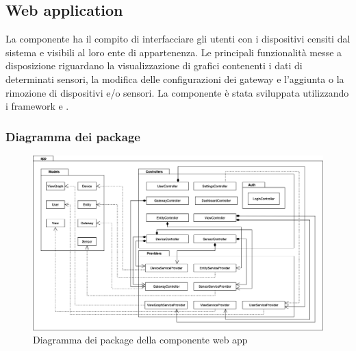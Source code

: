 \subsection{Web application}
	La componente  ha il compito di interfacciare gli utenti con i dispositivi censiti dal sistema e visibili al loro ente di appartenenza.
	\newline
	Le principali funzionalità messe a disposizione riguardano la visualizzazione di grafici contenenti i dati di determinati sensori, la modifica delle configurazioni dei gateway e l'aggiunta o la rimozione di dispositivi e/o sensori.
	\newline 
	La componente è stata sviluppata utilizzando i framework  e .
	
	\subsubsection{Diagramma dei package}%
		\begin{figure}[H]
			\centering
			\includegraphics[scale=0.450]{res/images/WEBAPP/WebAppPackage.png}
			\caption{Diagramma dei package della componente web app}
			\label{Diagramma 21}
		\end{figure}
	
